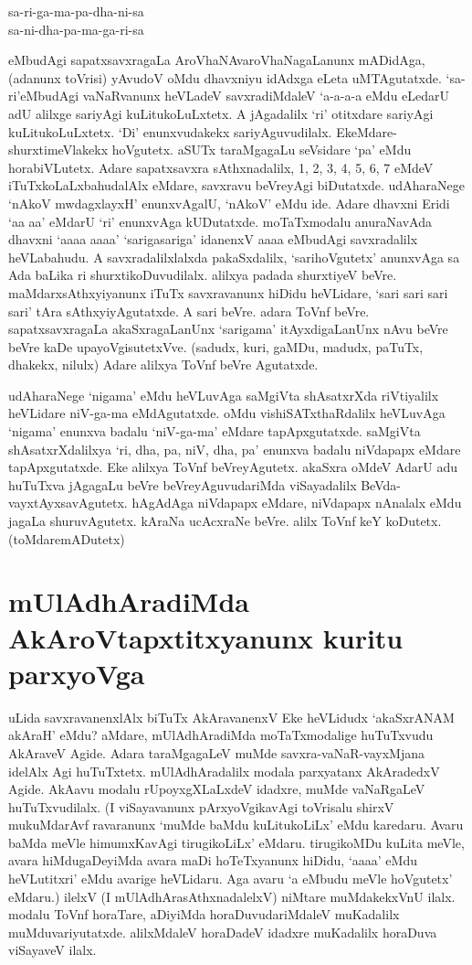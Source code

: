 \begin{shloka}
sa-ri-ga-ma-pa-dha-ni-sa\\
sa-ni-dha-pa-ma-ga-ri-sa
\end{shloka}
eMbudAgi sapatxsavxragaLa AroVhaNAvaroVhaNagaLanunx mADidAga, (adanunx toVrisi) yAvudoV oMdu dhavxniyu idAdxga eLeta uMTAgutatxde. `sa-ri'eMbudAgi vaNaRvanunx heVLadeV savxradiMdaleV `a-a-a-a eMdu eLedarU adU alilxge sariyAgi kuLitukoLuLxtetx. A jAgadalilx `ri' otitxdare sariyAgi kuLitukoLuLxtetx. `Di' enunxvudakekx sariyAguvudilalx. EkeMdare- shurxtimeVlakekx hoVgutetx. aSUTx taraMgagaLu seVsidare `pa' eMdu horabiVLutetx. Adare sapatxsavxra sAthxnadalilx, 1, 2, 3, 4, 5, 6, 7 eMdeV iTuTxkoLaLxbahudalAlx eMdare, savxravu beVreyAgi biDutatxde. udAharaNege `nAkoV mwdagxlayxH' enunxvAgalU, `nAkoV' eMdu ide. Adare dhavxni Eridi `a‌a  a‌a' eMdarU `ri' enunxvAga kUDutatxde. moTaTxmodalu anuraNavAda dhavxni `a‌aa‌a a‌aa‌a' `sarigasariga' idanenxV a‌aa‌a eMbudAgi savxradalilx heVLabahudu. A savxradalilxlalxda pakaSxdalilx, `sarihoVgutetx' anunxvAga sa Ada baLika ri shurxtikoDuvudilalx. alilxya padada shurxtiyeV beVre. maMdarxsAthxyiyanunx iTuTx savxravanunx hiDidu heVLidare, `sari sari sari sari' tAra sAthxyiyAgutatxde. A sari beVre. adara ToVnf beVre. sapatxsavxragaLa akaSxragaLanUnx `sarigama' itAyxdigaLanUnx nAvu beVre beVre kaDe upayoVgisutetxVve. (sadudx, kuri, gaMDu, madudx, paTuTx, dhakekx, nilulx) Adare alilxya ToVnf beVre Agutatxde.

udAharaNege `nigama' eMdu heVLuvAga saMgiVta shAsatxrXda riVtiyalilx heVLidare niV-ga-ma eMdAgutatxde. oMdu vishiSATxthaRdalilx heVLuvAga `nigama' enunxva badalu `niV-ga-ma' eMdare tapApxgutatxde. saMgiVta shAsatxrXdalilxya `ri, dha, pa, niV, dha, pa' enunxva badalu niVdapapx eMdare tapApxgutatxde. Eke alilxya ToVnf beVreyAgutetx. akaSxra oMdeV AdarU adu huTuTxva jAgagaLu beVre beVreyAguvudariMda viSayadalilx BeVda-vayxtAyxsavAgutetx. hAgAdAga niVdapapx eMdare, niVdapapx nAnalalx eMdu jagaLa shuruvAgutetx. kAraNa ucAcxraNe beVre. alilx ToVnf keY koDutetx. (toMdaremADutetx)

\section*{mUlAdhAradiMda AkAroVtapxtitxyanunx kuritu parxyoVga} 

uLida savxravanenxlAlx biTuTx AkAravanenxV Eke heVLidudx `akaSxrANAM akAraH' eMdu? aMdare, mUlAdhAradiMda moTaTxmodalige huTuTxvudu AkAraveV Agide. Adara taraMgagaLeV muMde savxra-vaNaR-vayxMjana idelAlx Agi huTuTxtetx. mUlAdhAradalilx modala parxyatanx AkAradedxV Agide. AkAavu modalu rUpoyxgXLaLxdeV idadxre, muMde vaNaRgaLeV huTuTxvudilalx. (I viSayavanunx pArxyoVgikavAgi toVrisalu shirxV mukuMdarAvf ravaranunx `muMde baMdu kuLitukoLiLx' eMdu karedaru. Avaru baMda meVle himumxKavAgi tirugikoLiLx' eMdaru. tirugikoMDu kuLita meVle, avara hiMdugaDeyiMda avara maDi hoTeTxyanunx hiDidu, `a‌aa‌a' eMdu heVLutitxri' eMdu avarige heVLidaru. Aga avaru `a eMbudu meVle hoVgutetx' eMdaru.) ilelxV (I mUlAdhArasAthxnadalelxV) niMtare muMdakekxVnU ilalx. modalu ToVnf horaTare, aDiyiMda horaDuvudariMdaleV muKadalilx muMduvariyutatxde. alilxMdaleV horaDadeV idadxre muKadalilx horaDuva viSayaveV ilalx.


